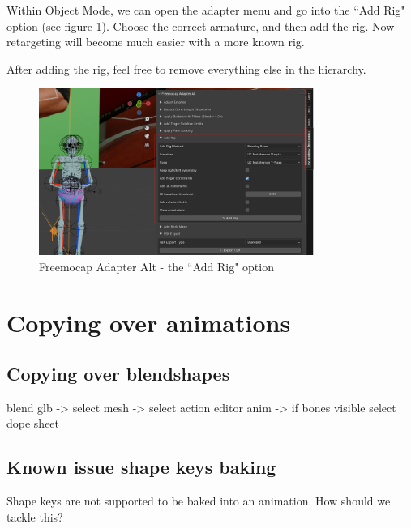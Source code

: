 \documentclass{uva-inf-article}
\begin{document}
Within Object Mode, we can open the adapter menu and go into the ``Add Rig" option (see figure \ref{fig:rigifyfreemocap}). Choose the correct armature, and then add the rig. Now retargeting will become much easier with a more known rig.

After adding the rig, feel free to remove everything else in the hierarchy.
\begin{figure}[hbt!]
    \centering
    \includegraphics[width=0.8\textwidth]{imgs/rigify.png}
    \caption{Freemocap Adapter Alt - the ``Add Rig" option}
    \label{fig:rigifyfreemocap}
\end{figure}

\section{Copying over animations}

\subsection{Copying over blendshapes}
blend glb -> select mesh -> select action editor anim -> if bones visible select dope sheet

\subsection{Known issue shape keys baking}
Shape keys are not supported to be baked into an animation. How should we tackle this?
\end{document}
